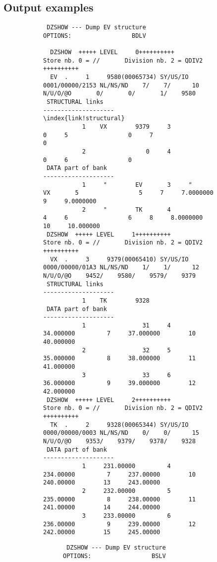 \subsection{Output examples}
\begin{figure}
\begin{figure}
\begin{verbatim}
 DZSHOW --- Dump EV structure                                                                      OPTIONS:                 BDLV
 
  DZSHOW  +++++ LEVEL     0++++++++++             Store nb. 0 = //       Division nb. 2 = QDIV2     ++++++++++
  EV  .     1     9580(00065734) SY/US/IO 0001/00000/2153 NL/NS/ND    7/    7/      10 N/U/O/@O       0/       0/       1/    9580
 STRUCTURAL links                                          --------------------
\index{link!structural}
           1    VX        9379     3                 0     5                 0     7                 0
           2                 0     4                 0     6                 0
 DATA part of bank                                         --------------------
           1     "        EV       3     "        VX       5                 5     7     7.0000000         9     9.0000000
           2     "        TK       4                 4     6                 6     8     8.0000000        10     10.000000
 DZSHOW  +++++ LEVEL     1++++++++++             Store nb. 0 = //       Division nb. 2 = QDIV2     ++++++++++
  VX  .     3     9379(00065410) SY/US/IO 0000/00000/01A3 NL/NS/ND    1/    1/      12 N/U/O/@O    9452/    9580/    9579/    9379
 STRUCTURAL links                                          --------------------
           1    TK        9328
 DATA part of bank                                         --------------------
           1                31     4     34.000000         7     37.000000        10     40.000000
           2                32     5     35.000000         8     38.000000        11     41.000000
           3                33     6     36.000000         9     39.000000        12     42.000000
 DZSHOW  +++++ LEVEL     2++++++++++             Store nb. 0 = //       Division nb. 2 = QDIV2     ++++++++++
  TK  .     2     9328(00065344) SY/US/IO 0000/00000/0003 NL/NS/ND    0/    0/      15 N/U/O/@O    9353/    9379/    9378/    9328
 DATA part of bank                                         --------------------
           1     231.00000         4     234.00000         7     237.00000        10     240.00000        13     243.00000
           2     232.00000         5     235.00000         8     238.00000        11     241.00000        14     244.00000
           3     233.00000         6     236.00000         9     239.00000        12     242.00000        15     245.00000
\end{verbatim}
\end{figure}
\begin{figure}
\begin{figure}
\begin{verbatim}
 DZSHOW --- Dump EV structure                                                                      OPTIONS:                 BSLV
 

\end{verbatim}
\end{figure}
\end{figure}
\end{figure}

